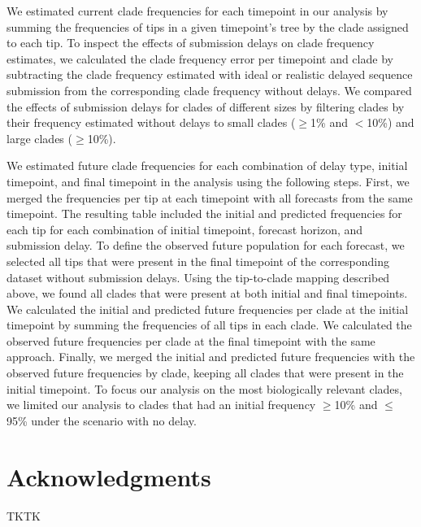 \documentclass[9pt,lineno]{elife}
\begin{document}
We estimated current clade frequencies for each timepoint in our analysis by summing the frequencies of tips in a given timepoint's tree by the clade assigned to each tip.
To inspect the effects of submission delays on clade frequency estimates, we calculated the clade frequency error per timepoint and clade by subtracting the clade frequency estimated with ideal or realistic delayed sequence submission from the corresponding clade frequency without delays.
We compared the effects of submission delays for clades of different sizes by filtering clades by their frequency estimated without delays to small clades ($\ge$1\% and $<$10\%) and large clades ($\ge$10\%).

We estimated future clade frequencies for each combination of delay type, initial timepoint, and final timepoint in the analysis using the following steps.
First, we merged the frequencies per tip at each timepoint with all forecasts from the same timepoint.
The resulting table included the initial and predicted frequencies for each tip for each combination of initial timepoint, forecast horizon, and submission delay.
To define the observed future population for each forecast, we selected all tips that were present in the final timepoint of the corresponding dataset without submission delays.
Using the tip-to-clade mapping described above, we found all clades that were present at both initial and final timepoints.
We calculated the initial and predicted future frequencies per clade at the initial timepoint by summing the frequencies of all tips in each clade.
We calculated the observed future frequencies per clade at the final timepoint with the same approach.
Finally, we merged the initial and predicted future frequencies with the observed future frequencies by clade, keeping all clades that were present in the initial timepoint.
To focus our analysis on the most biologically relevant clades, we limited our analysis to clades that had an initial frequency $\ge$10\% and $\le$95\% under the scenario with no delay.

\section{Acknowledgments}

TKTK

\nocite{*} %

\end{document}
